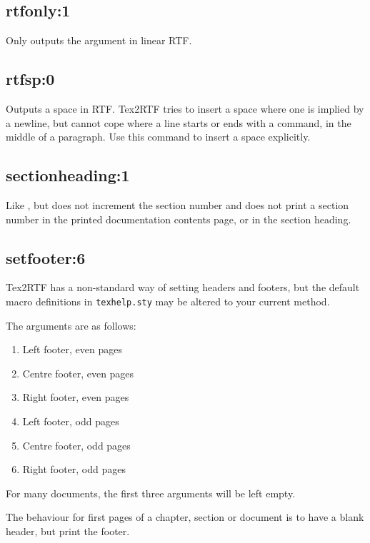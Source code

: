 \subsection*{rtfonly:1}\label{rtfonly}

Only outputs the argument in linear RTF.

\subsection*{rtfsp:0}\label{rtfsp}

Outputs a space in RTF. Tex2RTF tries to insert a space where one is implied
by a newline, but cannot cope where a line starts or ends with a command,
in the middle of a paragraph. Use this command to insert a space explicitly.

\subsection*{sectionheading:1}\label{sectionheading}

Like , but does not increment the section
number and does not print a section number in the printed documentation
contents page, or in the section heading.

\subsection*{setfooter:6}\label{setfooter}

Tex2RTF has a non-standard way of setting headers and footers,
but the default macro definitions in {\tt texhelp.sty} may be altered
to your current method.

The arguments are as follows:

\begin{enumerate}
\itemsep=0pt
\item Left footer, even pages
\item Centre footer, even pages
\item Right footer, even pages
\item Left footer, odd pages
\item Centre footer, odd pages
\item Right footer, odd pages
\end{enumerate}

For many documents, the first three arguments will be left empty.

The behaviour for first pages of a chapter, section or document
is to have a blank header, but print the footer.

